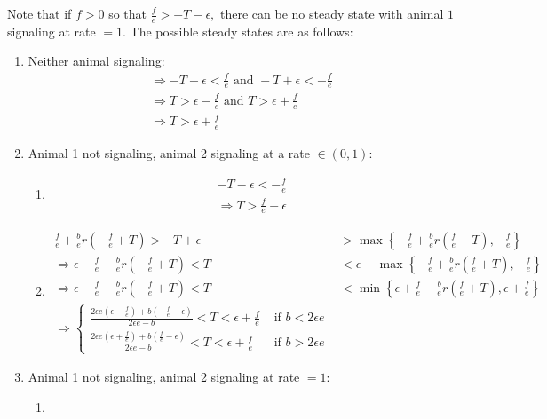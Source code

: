 \documentclass{article}
\begin{document}
Note that if $f>0$ so that $\frac{f}{e}>-T-\epsilon,$ there can be no steady state with animal $1$ signaling at rate $=1$.  The possible steady states are as follows:
\begin{enumerate}
\item Neither animal signaling:
\begin{align*}
\Rightarrow -T+\epsilon< \frac{f}{e} \text{ and } -T+\epsilon<-\frac{f}{e}
\\ \Rightarrow T>\epsilon-\frac{f}{e} \text{ and } T> \epsilon+\frac{f}{e}
\\ \Rightarrow T>\epsilon+\frac{f}{e}
\end{align*}
\item Animal 1 not signaling, animal 2 signaling at a rate $\in(0,1)$:
\begin{enumerate}
\item 
\begin{align*}
-T-\epsilon<-\frac{f}{e}
\\ \Rightarrow T>\frac{f}{e}-\epsilon
\end{align*}
\item \begin{align*}
\frac{f}{e}+\frac{b}{e}r\left(-\frac{f}{e}+T\right)>-T+\epsilon&>\max\left\{-\frac{f}{e}+\frac{b}{e}r\left(\frac{f}{e}+T\right),-\frac{f}{e}\right\}
\\ \Rightarrow \epsilon-\frac{f}{e}-\frac{b}{e}r\left(-\frac{f}{e}+T\right)<T&<\epsilon-\max\left\{-\frac{f}{e}+\frac{b}{e}r\left(\frac{f}{e}+T\right),-\frac{f}{e}\right\}
\\ \Rightarrow \epsilon-\frac{f}{e}-\frac{b}{e}r\left(-\frac{f}{e}+T\right)<T&<\min\left\{\epsilon+\frac{f}{e}-\frac{b}{e}r\left(\frac{f}{e}+T\right),\epsilon+\frac{f}{e}\right\}
\\ \Rightarrow \left\{\begin{array}{cccc} 
\frac{2\epsilon e(\epsilon -\frac{f}{e})+b(-\frac{f}{e}-\epsilon)}{2\epsilon e-b}<T<\epsilon+\frac{f}{e} &\text{ if } b<2\epsilon e
\\\frac{2\epsilon e(\epsilon +\frac{f}{e})+b(\frac{f}{e}-\epsilon)}{2\epsilon e-b}<T<\epsilon+\frac{f}{e} &\text{ if } b>2\epsilon e
\end{array}\right.
\end{align*}
\end{enumerate}
\item Animal 1 not signaling, animal 2 signaling at rate $=1$:
\begin{enumerate}
\item 
\begin{align*}

\end{align*}
\end{enumerate}
\end{enumerate}
\end{document}
